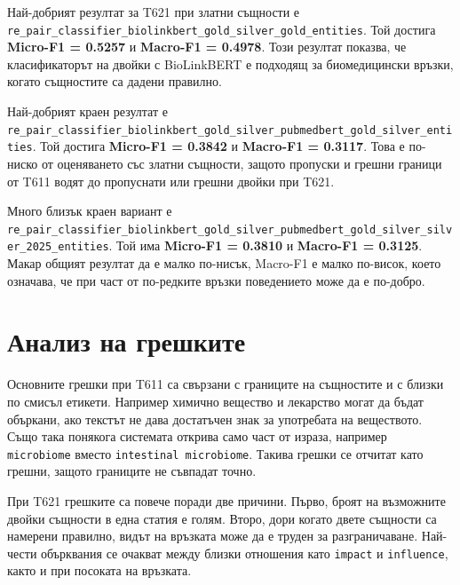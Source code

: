 \documentclass[12pt,a4paper]{article}
\newcommand{\metric}[1]{\textbf{#1}}
\begin{document}
Най-добрият резултат за T621 при златни същности е \texttt{re\_pair\_classifier\_biolinkbert\_gold\_silver\_gold\_entities}. Той достига \metric{Micro-F1 = 0.5257} и \metric{Macro-F1 = 0.4978}. Този резултат показва, че класификаторът на двойки с BioLinkBERT е подходящ за биомедицински връзки, когато същностите са дадени правилно.

Най-добрият краен резултат е \texttt{re\_pair\_classifier\_biolinkbert\_gold\_silver\_pubmedbert\_gold\_silver\_entities}. Той достига \metric{Micro-F1 = 0.3842} и \metric{Macro-F1 = 0.3117}. Това е по-ниско от оценяването със златни същности, защото пропуски и грешни граници от T611 водят до пропуснати или грешни двойки при T621.

Много близък краен вариант е \texttt{re\_pair\_classifier\_biolinkbert\_gold\_silver\_pubmedbert\_gold\_silver\_silver\_2025\_entities}. Той има \metric{Micro-F1 = 0.3810} и \metric{Macro-F1 = 0.3125}. Макар общият резултат да е малко по-нисък, Macro-F1 е малко по-висок, което означава, че при част от по-редките връзки поведението може да е по-добро.

\section{Анализ на грешките}

Основните грешки при T611 са свързани с границите на същностите и с близки по смисъл етикети. Например химично вещество и лекарство могат да бъдат объркани, ако текстът не дава достатъчен знак за употребата на веществото. Също така понякога системата открива само част от израза, например \texttt{microbiome} вместо \texttt{intestinal microbiome}. Такива грешки се отчитат като грешни, защото границите не съвпадат точно.

При T621 грешките са повече поради две причини. Първо, броят на възможните двойки същности в една статия е голям. Второ, дори когато двете същности са намерени правилно, видът на връзката може да е труден за разграничаване. Най-чести обърквания се очакват между близки отношения като \texttt{impact} и \texttt{influence}, както и при посоката на връзката.
\end{document}
